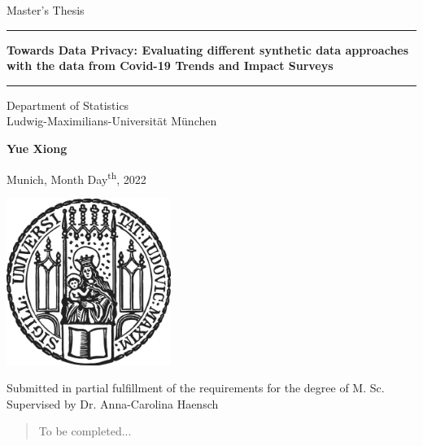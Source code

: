 \documentclass[12pt]{article}
\newcommand{\mytitle}{Towards Data Privacy: Evaluating different synthetic data approaches with the data from Covid-19 Trends and Impact Surveys}
\newcommand{\myname}{Yue Xiong}
\newcommand{\mysupervisor}{Dr. Anna-Carolina Haensch}
\begin{document}
 
\begin{titlepage}
\begin{center}
    
\LARGE
Master's Thesis
    
\vspace{0.5cm}
      
\rule{\textwidth}{1.5pt}
\LARGE
\textbf{\mytitle}
\rule{\textwidth}{1.5pt}
   
\vspace{0.5cm}
      
\large
Department of Statistics \\
Ludwig-Maximilians-Universität München 

\vfill

\Large
\textbf{\myname}

\vfill

\large
Munich, Month Day\textsuperscript{th}, 2022
      
\vfill
\includegraphics[width = 0.4\textwidth]{sigillum.png}
\vfill

\normalsize
Submitted in partial fulfillment of the requirements for the degree of M. Sc.
\\

Supervised by \mysupervisor

\end{center}
\end{titlepage}


\newpage

\begin{abstract}

To be completed...

\end{abstract}

\newpage
\tableofcontents
\end{document}
